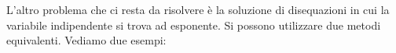 L'altro problema che ci resta da risolvere è la soluzione di disequazioni 
in cui la variabile indipendente si trova ad esponente. 
% 
Si possono utilizzare due metodi equivalenti. Vediamo due esempi:

\newpage %

